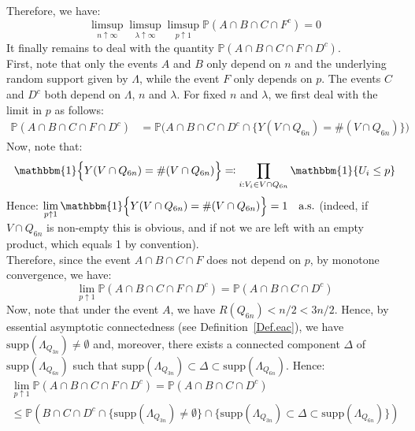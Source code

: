 \documentclass[10pt,a4paper]{amsart}
\theoremstyle{exampstyle}
\theoremstyle{exampnotations}
\begin{document}
Therefore, we have:
\begin{equation}
    \label{eq20}
    \limsup_{n \uparrow \infty} \limsup_{\lambda \uparrow \infty} \limsup_{p \uparrow 1} \mathbb{P}(A \cap B \cap C \cap F^c)=0
\end{equation}
It finally remains to deal with the quantity $\mathbb{P}(A \cap B \cap C \cap F \cap D^{c})$. \\
First, note that only the events $A$ and $B$ only depend on $n$ and the underlying random support given by $\Lambda$, while the event $F$ only depends on $p$. The events $C$ and $D^c$ both depend on $\Lambda$, $n$ and $\lambda$. For fixed $n$ and $\lambda$, we first deal with the limit in $p$ as follows:
\begin{align*}
    \mathbb{P}(A \cap B \cap C \cap F \cap D^c) &= \mathbb{P}\Big(A \cap B \cap C \cap D^c \cap \lbrace Y(V \cap Q_{6n}) = \#(V \cap Q_{6n}) \rbrace \Big)
\end{align*}
Now, note that:
\begin{equation*}
    \mathbbm{1}\Big\lbrace Y(V \cap Q_{6n}) = \#(V \cap Q_{6n}) \Big\rbrace \eqqcolon \prod_{i : V_i \in V \cap Q_{6n}} \mathbbm{1} \lbrace U_i \leq p \rbrace
\end{equation*}
Hence: $\displaystyle \lim_{p \uparrow 1} \mathbbm{1}\Big\lbrace Y(V \cap Q_{6n}) = \#(V \cap Q_{6n}) \Big\rbrace = 1 \quad \text{a.s.}$ (indeed, if $V\cap Q_{6n}$ is non-empty this is obvious, and if not we are left with an empty product, which equals 1 by convention). \\
Therefore, since the event $A \cap B \cap C \cap F$ does not depend on $p$, by monotone convergence, we have:
\begin{equation*}
\lim_{p \uparrow 1} \mathbb{P}(A \cap B \cap C \cap F \cap D^{c}) = \mathbb{P}(A \cap B \cap C \cap D^c) 
\end{equation*}
Now, note that under the event $A$, we have $R(Q_{6n}) < n/2 < 3n/2$. Hence, by essential asymptotic connectedness (see Definition~\ref{Def.eac}), we have $\text{supp}(\Lambda_{Q_{3n}}) \neq \emptyset$ and, moreover, there exists a connected component $\Delta$ of $\text{supp}(\Lambda_{Q_{6n}})$ such that $\text{supp}(\Lambda_{Q_{3n}}) \subset \Delta \subset \text{supp}(\Lambda_{Q_{6n}})$. Hence:
\begin{gather*}
    \lim_{p \uparrow 1} \mathbb{P}(A \cap B \cap C \cap F \cap D^{c})  = \mathbb{P}(A \cap B \cap C \cap D^c)  \\ \leq \mathbb{P}\left(B \cap C \cap D^c \cap \Big\lbrace \text{supp}(\Lambda_{Q_{3n}}) \neq \emptyset \Big\rbrace \cap \Big\lbrace \text{supp}(\Lambda_{Q_{3n}}) \subset \Delta \subset \text{supp}(\Lambda_{Q_{6n}}) \Big\rbrace \right)
\end{gather*}
\end{document}
